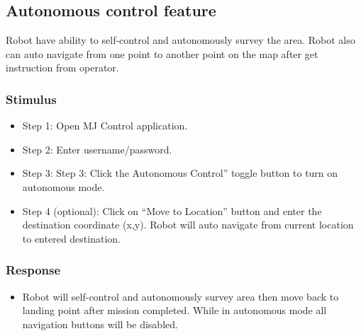 \documentclass[10pt,a4paper,titlepage]{article}
\begin{document}
	
	\subsection{Autonomous control feature }
	Robot have ability to self-control and autonomously survey the area. Robot also can auto navigate from one point to another point on the map after get instruction from operator.
	
	\subsubsection*{Stimulus}
	\begin{itemize}
		\item Step 1: Open MJ Control application.
		\item Step 2: Enter username/password.
		\item Step 3: Step 3: Click the Autonomous Control” toggle button to turn on autonomous mode.
		\item Step 4 (optional): Click on “Move to Location” button and enter the destination coordinate (x,y). Robot will auto navigate from current location to entered destination.
	\end{itemize}
	
	\subsubsection*{Response}
	\begin{itemize}
		\item Robot will self-control and autonomously survey area then move back to landing point after mission completed. While in autonomous mode all navigation buttons will be disabled.
	\end{itemize}
	
\end{document}

